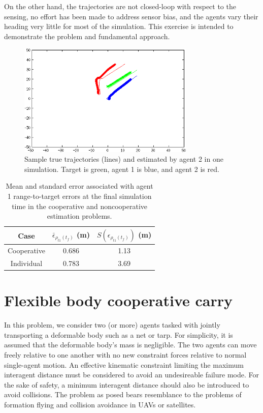 \documentclass{aiaa-tc}
\begin{document}
On the other hand, the trajectories are not closed-loop with respect to the sensing, no effort has been made to address sensor bias, and the agents vary their heading very little for most of the simulation. This exercise is intended to demonstrate the problem and fundamental approach.

\begin{figure}
\centering
\includegraphics[width=0.75\textwidth]{sample_traj.png}
\caption{ Sample true trajectories (lines) and estimated by agent 2 in one simulation. Target is green, agent 1 is blue, and agent 2 is red. }
\label{fig:sample_traj}
\end{figure}

\begin{table}
\centering
\begin{tabular}{|c|c|c|}
\hline
Case & $\bar{\epsilon}_{\rho_{t1}(t_f)}$ (m) &  $S(\epsilon_{\rho_{t1}(t_f)})$ (m)\\
\hline
Cooperative & 0.686 & 1.13\\
\hline
Individual & 0.783 & 3.69\\
\hline
\end{tabular}
\caption{Mean and standard error associated with agent 1 range-to-target errors at the final simulation time in the cooperative and noncooperative estimation problems.}
\label{tab:mean_std_errs}
\end{table}

\section{Flexible body cooperative carry}

In this problem, we consider two (or more) agents tasked with jointly transporting a deformable body such as a net or tarp. For simplicity, it is assumed that the deformable body's mass is negligible. The two agents can move freely relative to one another with no new constraint forces relative to normal single-agent motion. An effective kinematic constraint limiting the maximum interagent distance must be considered to avoid an undesireable failure mode. For the sake of safety, a minimum interagent distance should also be introduced to avoid collisions. The problem as posed bears resemblance to the problems of formation flying and collision avoidance in UAVs or satellites.
\end{document}
